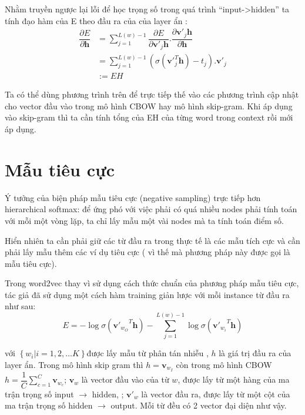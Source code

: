 Nhằm truyền ngược lại lỗi để học trọng số trong quá trình “input->hidden” ta tính đạo hàm của E theo đầu ra của của layer ẩn :
\begin{equation}
\begin{split}
\dfrac{\partial{E}}{\partial{\textbf{h}}} &= \sum^{L(w)-1}_{j=1} \dfrac {\partial{E}}{\partial{\textbf{v}'_{j} \textbf{h}}} . \dfrac{\partial{\textbf{v}'_{j} \textbf{h}}}{\partial{ \textbf{h}}}\\
&= \sum^{L(w)-1}_{j=1} \left( \sigma  \left( \textbf{v}'^{T}_{j} \textbf{h}\right) - t_j \right) . \textbf{v}'_{j} \\
&:=EH
\end{split}
\end{equation}

Ta có thể dùng phương trình trên để trực tiếp thế vào các phương trình cập nhật cho vector đầu vào trong mô hình CBOW hay mô hình skip-gram. Khi áp dụng vào skip-gram thì ta cần tính tổng của EH của từng word trong context rồi mới áp dụng.

\section{Mẫu tiêu cực}

Ý tưởng của biện pháp mẫu tiêu cực (negative sampling) trực tiếp hơn hierarchical softmax: để ứng phó với việc phải có quá nhiều nodes phải tính toán với mỗi một vòng lặp, ta chỉ lấy mẫu một vài nodes mà ta tính toán điểm số.  

Hiển nhiên ta cần phải giữ các từ đầu ra trong thực tế là các mẫu tích cực và cần phải lấy mẫu thêm các ví dụ tiêu cực ( vì thế mà phương pháp này được gọi là mẫu tiêu cực). 

Trong word2vec \cite{DBLP:conf/nips/MikolovSCCD13} thay vì sử dụng cách thức chuẩn của phương pháp mẫu tiêu cực, tác giả đã sử dụng một cách hàm training giản lược với mỗi instance từ đầu ra như sau:
\begin{equation}
E= - \log{ \sigma \left( {\textbf{v}'_{w_O}}^{T} \textbf{h}\right)} - \sum^{L(w)-1}_{j=1} \log{ \sigma \left( {\textbf{v}'_{w_i}}^{T} \textbf{h}\right)}
\end{equation}

với $ \left\lbrace  w_i | i=1,2,…K \right\rbrace $được lấy mẫu từ phân tán nhiễu , $h$ là giá trị đầu ra của layer ẩn. Trong mô hình skip gram thì $h= \textbf{v}_{w_I}$ còn trong mô hình CBOW $h=\dfrac{1}{C} \sum^{C}_{c=1} \textbf{v}_{w_c}$;  $\textbf{v}_w$ là vector đầu vào của từ $w$, được lấy từ một hàng của ma trận trọng số input  $ \rightarrow $ hidden, ; $\textbf{v}'_w$ là vector đầu ra, được lấy từ một cột của ma trận trọng số hidden $ \rightarrow $ output. Mỗi từ đều có 2 vector đại diện như vậy. 


